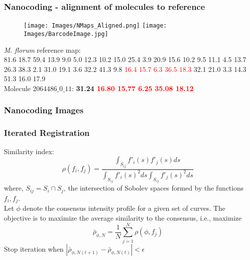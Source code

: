 \documentclass[10pt,dvipsnames,table]{beamer}
\begin{document}
\begin{frame}
\frametitle{Nanocoding - alignment of molecules to reference}
\vspace{-1cm}
\begin{figure}[t]
\texttt{[image: Images/NMaps\_Aligned.png]}
\hspace{1cm}
\texttt{[image: Images/BarcodeImage.jpg]}
\end{figure}

{\emph{M. florum}} reference map: \\
{\footnotesize{81.6 18.7 59.4 13.9 9.0 5.0 12.3 10.2 15.0 25.4 3.9 20.9 15.6 10.2 9.5 11.1 4.5 
13.7 26.3 38.3 2.1 31.0 19.1 3.6 32.2 41.3 9.8}} \textcolor{Red}{16.4 15.7 6.3 36.5 18.3} {\footnotesize{32.1 21.0 
3.3 14.3 51.3 16.0 17.9}} \\
\vspace{0.5cm}
Molecule {\small{$2064486\_0\_11$}}: {\bf{31.24 \textcolor{Red}{16.80  15.77  6.25  35.08  18.12}}}


\end{frame}

\begin{frame}
\frametitle{Nanocoding Images}
\end{frame}



\begin{frame}
\frametitle{Iterated Registration}
Similarity index:
\[ \rho(f_i, f_j) = \frac{\int _{S_{ij}}f'_i(s)f'_j(s) ds}{\int _{S_{ij}}f'_i(s)^2 ds \int _{S_{ij}}f'_j(s)^2 ds} \]
where, $S_{ij} = S_i \cap S_j$, the intersection of Sobolev spaces formed by the functions $f_i, f_j$.\\

Let $\phi$ denote the consensus intensity profile for a given set of curves. The objective is to maximize the average similarity to the consensus, i.e., maximize
\[ \bar{\rho}_{\phi, N} = \frac{1}{N} \sum \limits_{j = 1}^{N} \rho(\phi, f_j)\]
Stop iteration when $|\bar{\rho}_{\phi, N (t+1)} - \bar{\rho}_{\phi, N (t)} | < \epsilon$
\end{frame}
\end{document}
